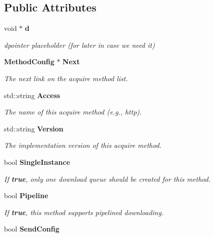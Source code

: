 \subsection*{\-Public \-Attributes}
\begin{DoxyCompactItemize}
\item 
void $\ast$ {\bf d}\label{structpkgAcquire_1_1MethodConfig_ac948f13dbf1ed6a8ad17f9b44a1343d1}

\begin{DoxyCompactList}\small\item\em dpointer placeholder (for later in case we need it) \end{DoxyCompactList}\item 
{\bf \-Method\-Config} $\ast$ {\bf \-Next}
\begin{DoxyCompactList}\small\item\em \-The next link on the acquire method list. \end{DoxyCompactList}\item 
std\-::string {\bf \-Access}\label{structpkgAcquire_1_1MethodConfig_a006a979c4801f6b6ceb33cb3acd6dc89}

\begin{DoxyCompactList}\small\item\em \-The name of this acquire method (e.\-g., http). \end{DoxyCompactList}\item 
std\-::string {\bf \-Version}\label{structpkgAcquire_1_1MethodConfig_a9128f413b7890b2493b88f88fe258259}

\begin{DoxyCompactList}\small\item\em \-The implementation version of this acquire method. \end{DoxyCompactList}\item 
bool {\bf \-Single\-Instance}\label{structpkgAcquire_1_1MethodConfig_a73e5dd8b9abd83a562ded9c050af4fc5}

\begin{DoxyCompactList}\small\item\em \-If {\bfseries true}, only one download queue should be created for this method. \end{DoxyCompactList}\item 
bool {\bf \-Pipeline}\label{structpkgAcquire_1_1MethodConfig_a184f137ba7f14f7867d1480d05645973}

\begin{DoxyCompactList}\small\item\em \-If {\bfseries true}, this method supports pipelined downloading. \end{DoxyCompactList}\item 
bool {\bf \-Send\-Config}\label{structpkgAcquire_1_1MethodConfig_aeb5234a93cf150f464001a2768eb7b27}


\end{DoxyCompactItemize}
